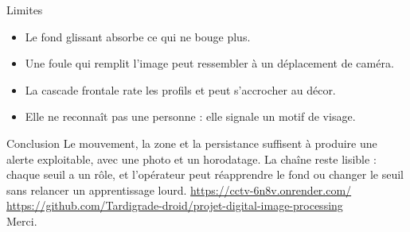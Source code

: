 \documentclass[11pt,aspectratio=169]{beamer}
\begin{document}
\begin{frame}{Limites}
  \begin{itemize}
    \item Le fond glissant absorbe ce qui ne bouge plus.
    \item Une foule qui remplit l'image peut ressembler à un déplacement de caméra.
    \item La cascade frontale rate les profils et peut s'accrocher au décor.
    \item Elle ne reconnaît pas une personne : elle signale un motif de visage.
  \end{itemize}
\end{frame}

\begin{frame}{Conclusion}
  Le mouvement, la zone et la persistance suffisent à produire une alerte exploitable, avec une photo et un horodatage.
  \vspace{0.8em}
  La chaîne reste lisible : chaque seuil a un rôle, et l'opérateur peut réapprendre le fond ou changer le seuil sans relancer un apprentissage lourd.
  \vspace{1.2em}
  \centering
  \url{https://cctv-6n8v.onrender.com/}\\[0.35em]
  {\scriptsize \url{https://github.com/Tardigrade-droid/projet-digital-image-processing}}\\[0.45em]
  Merci.
\end{frame}
\end{document}
